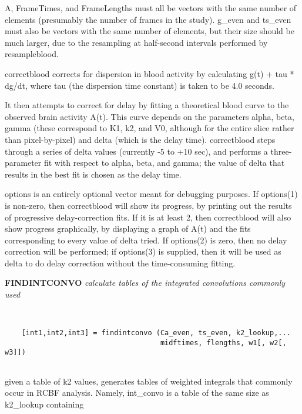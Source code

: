    A, FrameTimes, and FrameLengths must all be vectors with the same
   number of elements (presumably the number of frames in the study).
   g\_even and ts\_even must also be vectors with the same number of
   elements, but their size should be much larger, due to the
   resampling at half-second intervals performed by resampleblood.
   
   correctblood corrects for dispersion in blood activity by
   calculating g(t) + tau * dg/dt, where tau (the dispersion time
   constant) is taken to be 4.0 seconds.
 
   It then attempts to correct for delay by fitting a theoretical blood
   curve to the observed brain activity A(t).  This curve depends
   on the parameters alpha, beta, gamma (these correspond to K1, k2,
   and V0, although for the entire slice rather than pixel-by-pixel) and
   delta (which is the delay time).  correctblood steps through a series
   of delta values (currently -5 to +10 sec), and performs a three-
   parameter fit with respect to alpha, beta, and gamma; the value of
   delta that results in the best fit is chosen as the delay time.
 
   options is an entirely optional vector meant for debugging purposes.
   If options(1) is non-zero, then correctblood will show its progress,
   by printing out the results of progressive delay-correction fits.  If 
   it is at least 2, then correctblood will also show progress graphically,
   by displaying a graph of A(t) and the fits corresponding to every
   value of delta tried.  If options(2) is zero, then no delay correction
   will be performed; if options(3) is supplied, then it will be
   used as delta to do delay correction without the time-consuming
   fitting.
\newpage


{\large\bf FINDINTCONVO} {\em   calculate tables of the integrated convolutions commonly used}
\begin{verbatim}


    [int1,int2,int3] = findintconvo (Ca_even, ts_even, k2_lookup,...
                                     midftimes, flengths, w1[, w2[, w3]])


\end{verbatim}

  given a table of k2 values, generates tables of weighted integrals
  that commonly occur in RCBF analysis.  Namely, int\_convo is a table of
  the same size as k2\_lookup containing
 
